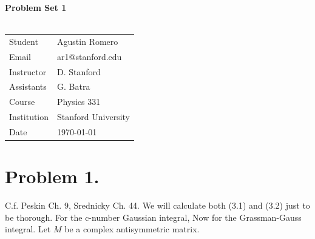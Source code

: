 \documentclass{article}
\begin{document}
\begin{center}
\textbf{\Large{Problem Set 1}}\\~\\
\begin{tabular}{l l}
Student&Agustin Romero\\
Email&ar1@stanford.edu\\
Instructor&D. Stanford\\
Assistants&G. Batra\\
Course&Physics 331\\
Institution&Stanford University\\
Date&\today\\
\end{tabular}
\end{center}
\section*{Problem 1.}
C.f. Peskin Ch. 9, Srednicky Ch. 44. We will calculate both (3.1) and (3.2) just to be thorough. For the c-number Gaussian integral,
Now for the Grassman-Gauss integral. Let $M$ be a complex antisymmetric matrix.
\end{document}
